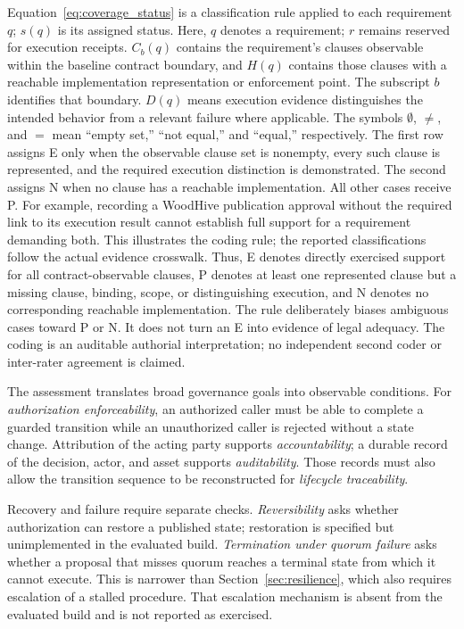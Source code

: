 \documentclass[journal]{IEEEtran}
\begin{document}
Equation~\ref{eq:coverage_status} is a classification rule applied
to each requirement $q$; $s(q)$ is its assigned status. Here, $q$
denotes a requirement; $r$ remains reserved for execution receipts.
$C_b(q)$ contains the requirement's clauses observable within the
baseline contract boundary, and $H(q)$ contains those clauses with
a reachable implementation representation or enforcement point.
The subscript $b$ identifies that boundary. $D(q)$ means execution
evidence distinguishes the intended behavior from a relevant
failure where applicable. The symbols $\emptyset$, $\neq$, and $=$
mean ``empty set,'' ``not equal,'' and ``equal,'' respectively. The first row assigns E only when the observable clause
set is nonempty, every such clause is represented, and the required
execution distinction is demonstrated. The second assigns N when
no clause has a reachable implementation. All other cases receive P.
For example, recording a WoodHive publication approval without the
required link to its execution result cannot establish full support
for a requirement demanding both. This illustrates the coding rule;
the reported classifications follow the actual evidence crosswalk.
Thus, E denotes directly exercised support for all contract-observable clauses,
P denotes at least one represented clause but a missing clause, binding,
scope, or distinguishing execution, and N denotes no corresponding reachable
implementation. The rule deliberately biases ambiguous cases toward P or N.
It does not turn an E into evidence of legal adequacy. The coding is an
auditable authorial interpretation; no independent second coder or inter-rater
agreement is claimed.

The assessment translates broad governance goals into observable conditions.
For \emph{authorization enforceability}, an authorized caller must be able
to complete a guarded transition while an unauthorized caller is rejected
without a state change. Attribution of the acting party supports
\emph{accountability}; a durable record of the decision, actor, and asset
supports \emph{auditability}. Those records must also allow the transition
sequence to be reconstructed for \emph{lifecycle traceability}.

Recovery and failure require separate checks. \emph{Reversibility} asks
whether authorization can restore a published state; restoration is
specified but unimplemented in the evaluated build. \emph{Termination
under quorum failure} asks whether a proposal that misses quorum reaches
a terminal state from which it cannot execute. This is narrower than
Section~\ref{sec:resilience}, which also requires escalation of a stalled
procedure. That escalation mechanism is absent from the evaluated build
and is not reported as exercised.
\end{document}
